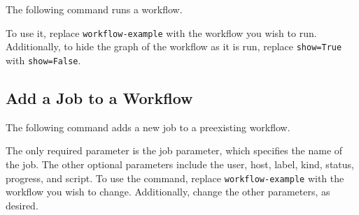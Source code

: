 The following command runs a workflow.

To use it, replace \texttt{workflow-example} with the workflow you wish
to run. Additionally, to hide the graph of the workflow as it is run,
replace \texttt{show=True} with \texttt{show=False}.

\begin{Shaded}
\begin{Highlighting}[]
   \DataTypeTok{\textbackslash{}}
     \DataTypeTok{\textbackslash{}}
     
\end{Highlighting}
\end{Shaded}

\hypertarget{add-a-job-to-a-workflow}{%
\subsection{Add a Job to a Workflow}\label{add-a-job-to-a-workflow}}

The following command adds a new job to a preexisting workflow.

The only required parameter is the job parameter, which specifies the
name of the job. The other optional parameters include the user, host,
label, kind, status, progress, and script. To use the command, replace
\texttt{workflow-example} with the workflow you wish to change.
Additionally, change the other parameters, as desired.

\begin{Shaded}
\begin{Highlighting}[]
   \DataTypeTok{\textbackslash{}}
     \DataTypeTok{\textbackslash{}}
     
\end{Highlighting}
\end{Shaded}
